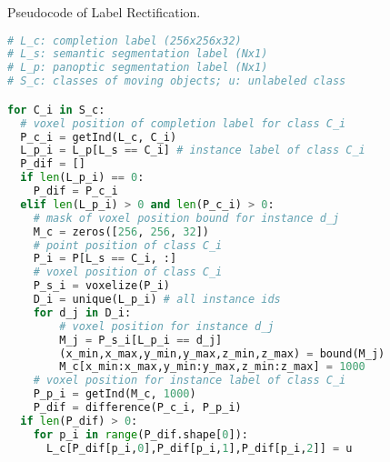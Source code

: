 \documentclass[10pt,twocolumn,letterpaper]{article}
\makeatletter
\let\@algcomment\relax
\newcommand\algcomment[1]{\def\@algcomment{\footnotesize#1}}
\makeatother
\begin{document}
\begin{algorithm}[ht]
\caption{Pseudocode of Label Rectification.}
\label{alg:code}
\algcomment{\fontsize{7.2pt}{1em}\selectfont \texttt{getInd(A, b)}: get indices of b in A; \texttt{bound}: get bound of matrix; \texttt{difference(A, B)}: difference set of A minus B.
\vspace{-2ex}
}
\begin{lstlisting}[language=python]
# L_c: completion label (256x256x32)
# L_s: semantic segmentation label (Nx1)
# L_p: panoptic segmentation label (Nx1)
# S_c: classes of moving objects; u: unlabeled class

for C_i in S_c:
  # voxel position of completion label for class C_i
  P_c_i = getInd(L_c, C_i) 
  L_p_i = L_p[L_s == C_i] # instance label of class C_i
  P_dif = []
  if len(L_p_i) == 0:
    P_dif = P_c_i
  elif len(L_p_i) > 0 and len(P_c_i) > 0:
    # mask of voxel position bound for instance d_j
    M_c = zeros([256, 256, 32])
    # point position of class C_i
    P_i = P[L_s == C_i, :]
    # voxel position of class C_i
    P_s_i = voxelize(P_i)
    D_i = unique(L_p_i) # all instance ids
    for d_j in D_i:
        # voxel position for instance d_j
        M_j = P_s_i[L_p_i == d_j] 
        (x_min,x_max,y_min,y_max,z_min,z_max) = bound(M_j)
        M_c[x_min:x_max,y_min:y_max,z_min:z_max] = 1000
    # voxel position for instance label of class C_i
    P_p_i = getInd(M_c, 1000) 
    P_dif = difference(P_c_i, P_p_i)
  if len(P_dif) > 0:
    for p_i in range(P_dif.shape[0]):
      L_c[P_dif[p_i,0],P_dif[p_i,1],P_dif[p_i,2]] = u
\end{lstlisting}
\end{algorithm}
\end{document}
